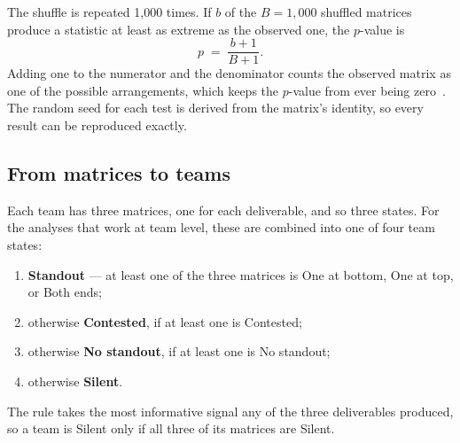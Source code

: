 The shuffle is repeated 1{,}000 times. If $b$ of the $B = 1{,}000$ shuffled
matrices produce a statistic at least as extreme as the observed one, the
$p$-value is
\begin{equation}
  p \;=\; \frac{b + 1}{B + 1}.
  \label{eq:perm-p}
\end{equation}
Adding one to the numerator and the denominator counts the observed matrix as
one of the possible arrangements, which keeps the $p$-value from ever being
zero~\citep{north2002empirical, phipson2010permutation}. The random seed for
each test is derived from the matrix's identity, so every result can be
reproduced exactly.

\subsection{From matrices to teams}
\label{sec:cascade-triage}

Each team has three matrices, one for each deliverable, and so three states.
For the analyses that work at team level, these are combined into one of four
team states:
\begin{enumerate}
  \item \textbf{Standout} --- at least one of the three matrices is One at
    bottom, One at top, or Both ends;
  \item otherwise \textbf{Contested}, if at least one is Contested;
  \item otherwise \textbf{No standout}, if at least one is No standout;
  \item otherwise \textbf{Silent}.
\end{enumerate}
The rule takes the most informative signal any of the three deliverables
produced, so a team is Silent only if all three of its matrices are Silent.
